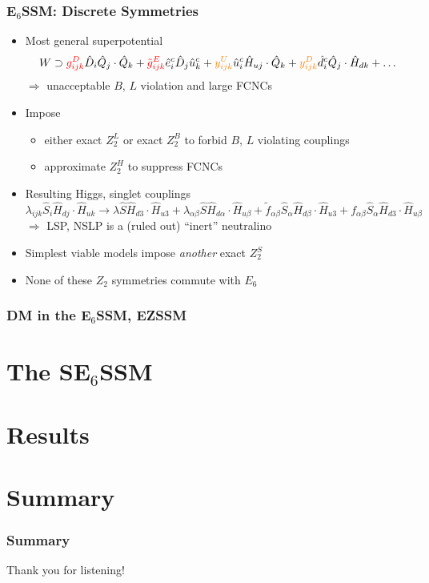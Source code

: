 \documentclass[10pt,aspectratio=169]{beamer}
\begin{document}
\begin{frame}
  \frametitle{E$_6$SSM: Discrete Symmetries}
  \begin{itemize}\itemsep0.8em
  \item Most general superpotential
    \begin{equation*}
      W \supset {\color{red} g_{ijk}^D} \hat{D}_i \hat{Q}_j \cdot \hat{Q}_k
      + {\color{red} \tilde{g}_{ijk}^E} \hat{e}_i^c \hat{D}_j \hat{u}_k^c
      + {\color{orange} y_{ijk}^U} \hat{u}_i^c \hat{H}_{uj} \cdot \hat{Q}_k
      + {\color{orange} y_{ijk}^D} \hat{d}_i^c \hat{Q}_j \cdot
      \hat{H}_{dk} + \ldots
    \end{equation*}
    $\Rightarrow$ {\color{red} unacceptable $B$, $L$ violation} and
        {\color{orange} large FCNCs}
      \item Impose
        \begin{itemize}
          \item either exact $Z_2^L$ or exact $Z_2^B$ to forbid
            $B$, $L$ violating couplings
          \item approximate $Z_2^H$ to suppress FCNCs
        \end{itemize}
    \item Resulting Higgs, singlet couplings
      \begin{equation*}
        \lambda_{ijk} \hat{S}_i \hat{H}_{dj} \cdot \hat{H}_{uk}
        \rightarrow \lambda \hat{S} \hat{H}_{d3} \cdot \hat{H}_{u3}
        + \lambda_{\alpha\beta} \hat{S} \hat{H}_{d\alpha} \cdot
        \hat{H}_{u\beta} + \tilde{f}_{\alpha\beta} \hat{S}_\alpha
        \hat{H}_{d\beta} \cdot \hat{H}_{u3} + f_{\alpha\beta}
        \hat{S}_\alpha \hat{H}_{d3} \cdot \hat{H}_{u\beta}
      \end{equation*}
      $\Rightarrow$ LSP, NSLP is a (ruled out) ``inert'' neutralino
    \item Simplest viable models impose \emph{another} exact $Z_2^S$
    \item \alert{None of these $Z_2$ symmetries commute with $E_6$}
  \end{itemize}
\end{frame}

\begin{frame}
  \frametitle{DM in the E$_6$SSM, EZSSM}
\end{frame}

\section{The SE$_6$SSM}

\section{Results}

\section{Summary}

\begin{frame}
  \frametitle{Summary}
    \begin{center}
    \large Thank you for listening!
  \end{center}
\end{frame}
\end{document}

